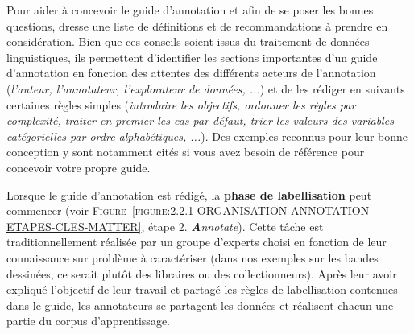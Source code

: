 			\begin{leftBarInformation}
				Pour aider à concevoir le guide d'annotation et afin de se poser les bonnes questions, \cite{dipper-etal:2004:useradaptive-annotation-guidelines} dresse une liste de définitions et de recommandations à prendre en considération.
				Bien que ces conseils soient issus du traitement de données linguistiques, ils permettent d'identifier les sections importantes d'un guide d'annotation en fonction des attentes des différents acteurs de l'annotation (\textit{l'auteur, l'annotateur, l'explorateur de données, ...}) et de les rédiger en suivants certaines règles simples (\textit{introduire les objectifs, ordonner les règles par complexité, traiter en premier les cas par défaut, trier les valeurs des variables catégorielles par ordre alphabétiques, ...}).
				Des exemples reconnus pour leur bonne conception y sont notamment cités si vous avez besoin de référence pour concevoir votre propre guide.
			\end{leftBarInformation}
			
			
			
			Lorsque le guide d'annotation est rédigé, la \textbf{phase de labellisation} peut commencer (voir \textsc{Figure~\ref{figure:2.2.1-ORGANISATION-ANNOTATION-ETAPES-CLES-MATTER}}, étape 2. \textit{\textbf{A}nnotate}).
			Cette tâche est traditionnellement réalisée par un groupe d'experts choisi en fonction de leur connaissance sur problème à caractériser (dans nos exemples sur les bandes dessinées, ce serait plutôt des libraires ou des collectionneurs).
			Après leur avoir expliqué l'objectif de leur travail et partagé les règles de labellisation contenues dans le guide, les annotateurs se partagent les données et réalisent chacun une partie du corpus d'apprentissage.
			
			
